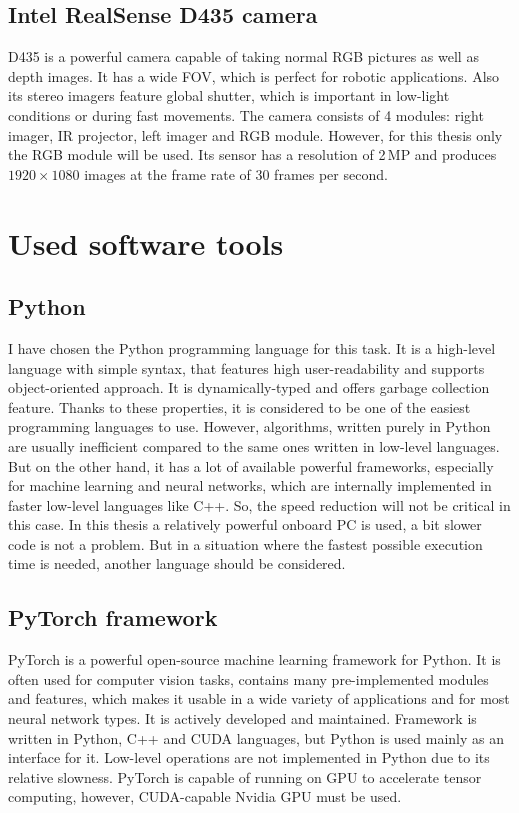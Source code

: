 \subsection{Intel RealSense D435 camera}

D435 is a powerful camera capable of taking normal \acs{RGB} pictures as well as depth images. It has a wide \acs{FOV}, which is perfect for robotic applications. Also its stereo imagers feature global shutter, which is important in low-light conditions or during fast movements. The camera consists of 4 modules: right imager, \acs{IR} projector, left imager and \acs{RGB} module. However, for this thesis only the \acs{RGB} module will be used. Its sensor has a resolution of 2\,MP and produces $1920\times1080$ images at the frame rate of 30 frames per second.


\section{Used software tools}

\subsection{Python}

I have chosen the Python programming language for this task. It is a high-level language with simple syntax, that features high user-readability and supports object-oriented approach. It is dynamically-typed and offers garbage collection feature. Thanks to these properties, it is considered to be one of the easiest programming languages to use. However, algorithms, written purely in Python are usually inefficient compared to the same ones written in low-level languages. But on the other hand, it has a lot of available powerful frameworks, especially for machine learning and neural networks, which are internally implemented in faster low-level languages like C++. So, the speed reduction will not be critical in this case. In this thesis a relatively powerful onboard PC is used, a bit slower code is not a problem. But in a situation where the fastest possible execution time is needed, another language should be considered. 

\subsection{PyTorch framework}

PyTorch is a powerful open-source machine learning framework for Python. It is often used for computer vision tasks, contains many pre-implemented modules and features, which makes it usable in a wide variety of applications and for most neural network types. It is actively developed and maintained. Framework is written in Python, C++ and CUDA languages, but Python is used mainly as an interface for it. Low-level operations are not implemented in Python due to its relative slowness. PyTorch is capable of running on \acs{GPU} to accelerate tensor computing, however, CUDA-capable Nvidia \acs{GPU} must be used. 


